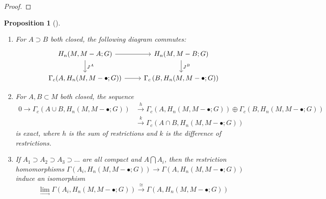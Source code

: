 \documentclass[reqno]{amsart}
\newtheorem{proposition}[theorem]{Proposition}
\theoremstyle{definition}
\theoremstyle{remark}
\begin{document}
\begin{proof}
    \todo{}
\end{proof}

\begin{proposition}[]\label{Prop:SIDJOXOLLWQU}
    \begin{enumerate}
        \item 
    For $A \supset B$ both closed, the following
    diagram commutes:
    \begin{equation*}
    \begin{tikzcd}
        H_n(M, M - A;G) \ar[r] \ar[d, "J^{A}"] &
        H_n(M, M - B ; G) \ar[d, "J^{B}"] \\
        \Gamma_c (A,
        H_n(M, M - \bullet ; G)) \ar[r] & 
        \Gamma_c \left( B,
        H_n(M, M - \bullet; G) \right) 
    \end{tikzcd}
    \end{equation*}
\item  For $A , B \subset M$ both closed, the sequence
        \begin{align*}
    0 \to \Gamma_c (A \cup B, 
    H_n(M, M - \bullet;G)) 
    &\stackrel{h}{\to} 
    \Gamma_c \left( A, H_n(M, M - \bullet;G) \right) 
    \oplus \Gamma_c \left( 
    B, H_n(M, M - \bullet; G) \right)\\
    &\stackrel{k}{\to} 
    \Gamma_c \left( A \cap B,
    H_n\left( M, M-\bullet; G \right) \right) 
        \end{align*}
    is exact, where $h$ is the sum of restrictions and
    $k$ is the difference of restrictions.
\item If $A_1 \supset A_2 \supset A_3 \supset \ldots$ are
    all compact and $A \bigcap A_i  $, then the restriction
    homomorphisms
    $\Gamma \left( A_i, H_n \left( M, M - \bullet; G \right)  \right) 
    \to \Gamma \left( A, H_n \left( M, M- \bullet; G \right) 
    \right) $ induce an isomorphism
    \[
    \lim_{\rightarrow} \Gamma
    \left( A_i, H_n\left( M, M - \bullet;G \right)  \right) 
    \stackrel{\cong}{\to} 
    \Gamma \left( A, H_n (M, M- \bullet;G) \right) 
    \] 
    \end{enumerate}
\end{proposition}
\end{document}
